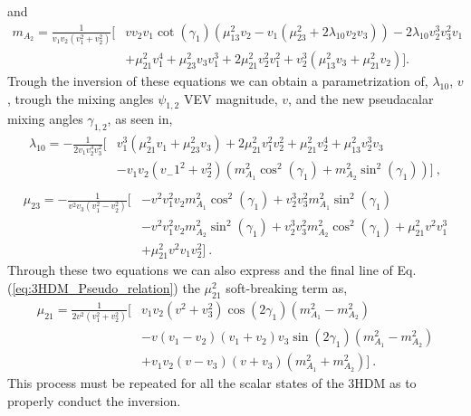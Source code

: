 \documentclass[10pt]{book}
\renewcommand{\(}{\left(}
\renewcommand{\)}{\right)}
\renewcommand{\[}{\left[}
\renewcommand{\]}{\right]}
\begin{document}
%
and 
%
\begin{equation}
\begin{split}
m_{A_2} = \frac{1}{v_1 v_2 \left(v_1^2+v_2^2\right)} \Bigg[ & v v_2 v_1 \cot \left(\gamma _1\right) \left(\mu _{13}^2 v_2-v_1 \left(\mu _{23}^2+2 \lambda _{10} v_2 v_3\right)\right)-2 \lambda_{10} v_2^3 v_3^2 v_1 \\ & +\mu _{21}^2 v_1^4+\mu _{23}^2 v_3 v_1^3+2 \mu_{21}^2 v_2^2 v_1^2+v_2^3 \left(\mu _{13}^2 v_3+\mu _{21}^2 v_2\right) \Bigg].
\end{split} 
\end{equation} 
%
Trough the inversion of these equations we can obtain a parametrization of, $\lambda_{10}$, $v$, trough the mixing angles $\psi_{1,2}$ VEV magnitude, $v$, and the new pseudacalar mixing angles $\gamma_{1,2}$, as seen in,
%
\begin{equation}
\begin{split}
\lambda_{10} = - \frac{1}{2 v_1 v_2^3 v_3^2}  \Bigg[ & v_1^3 \left(\mu_{21}^2 v_1+\mu_{23}^2 v_3 \right) +2 \mu_{21}^2 v_1^2 v_2^2 + \mu_{21}^2 v_2^4 +\mu_{13}^2 v_2^3 v_3 \\ & - v_1 v_2 \left( v_-1^2 + v_2^2 \right) \left(m_{A_1}^2 \cos^2\left(\gamma _1\right)+m_{A_2}^2 \sin ^2\left(\gamma _1\right)\right) \Bigg] \ , \\
\end{split}
\end{equation}
%
\begin{equation}
\begin{split}
\mu_{23} = -\frac{1}{v^2 v_3 \left(v_1^2-v_2^2\right)} \Bigg[  & -v^2 v_1^2 v_2 m_{A_1}^2 \cos ^2\left(\gamma _1\right)+v_2^3 v_3^2 m_{A_1}^2 \sin ^2\left(\gamma _1\right) \\ & - v^2 v_1^2 v_2 m_{A_2}^2 \sin^2\left(\gamma _1\right)  +v_2^3 v_3^2 m_{A_2}^2\cos^2\left(\gamma _1\right)+\mu_{21}^2 v^2 v_1^3 \\ & + \mu_{21}^2 v^2 v_1 v_2^2 \Bigg] \  . 
\end{split}
\end{equation}
Through these two equations we can also express and the final line of Eq.\,(\ref{eq:3HDM_Pseudo_relation}) the $\mu_{21}^2$ soft-breaking term as, 
\begin{equation}
\begin{split} 
\mu_{21}  = \frac{1}{2 v^2 \left(v_1^2+v_2^2\right)} \Bigg[& v_1 v_2 \left(v^2+v_3^2\right) \cos \left(2 \gamma _1\right) \left(m_{A_1}^2-m_{A_2}^2\right) \\ & - v \left(v_1-v_2\right) \left(v_1+v_2\right) v_3 \sin \left(2 \gamma _1\right) 
   \left(m_{A_1}^2-m_{A_2}^2\right) \\ & +v_1 v_2 \left(v-v_3\right) \left(v+v_3\right) \left(m_{A_1}^2+m_{A_2}^2\right) \Bigg] \ .  
\end{split}
\end{equation}
%
This process must be repeated for all the scalar states of the 3HDM as to properly conduct the inversion. 
%
\end{document}
